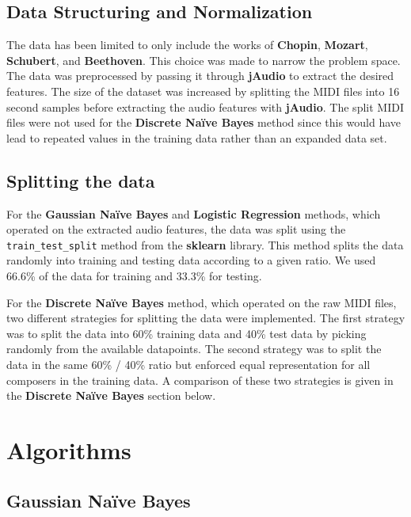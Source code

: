 \documentclass[11pt]{article}
\begin{document}
\subsection{Data Structuring and
Normalization}\label{data-structuring-and-normalization}

The data has been limited to only include the works of \textbf{Chopin},
\textbf{Mozart}, \textbf{Schubert}, and \textbf{Beethoven}. This choice
was made to narrow the problem space. The data was preprocessed by
passing it through \textbf{jAudio} to extract the desired features. The
size of the dataset was increased by splitting the MIDI files into 16
second samples before extracting the audio features with
\textbf{jAudio}. The split MIDI files were not used for the
\textbf{Discrete Naïve Bayes} method since this would have lead to
repeated values in the training data rather than an expanded data set.

\subsection{Splitting the data}\label{splitting-the-data}

For the \textbf{Gaussian Naïve Bayes} and \textbf{Logistic Regression}
methods, which operated on the extracted audio features, the data was
split using the \texttt{train\_test\_split} method from the
\textbf{sklearn} library. This method splits the data randomly into
training and testing data according to a given ratio. We used 66.6\% of
the data for training and 33.3\% for testing.

For the \textbf{Discrete Naïve Bayes} method, which operated on the raw
MIDI files, two different strategies for splitting the data were
implemented. The first strategy was to split the data into 60\% training
data and 40\% test data by picking randomly from the available
datapoints. The second strategy was to split the data in the same 60\% /
40\% ratio but enforced equal representation for all composers in the
training data. A comparison of these two strategies is given in the
\textbf{Discrete Naïve Bayes} section below.

\newpage

\section{Algorithms}\label{algorithms}

\subsection{Gaussian Naïve Bayes}\label{gaussian-nauxefve-bayes}
\end{document}
